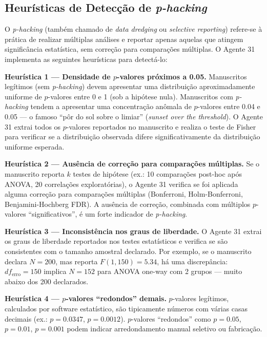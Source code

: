 
\subsection{Heurísticas de Detecção de \textit{p-hacking}}
\label{sec:phacking}

O \textit{p-hacking} (também chamado de \textit{data dredging} ou
\textit{selective reporting}) refere-se à prática de realizar
múltiplas análises e reportar apenas aquelas que atingem
significância estatística, sem correção para comparações
múltiplas. O Agente 31 implementa as seguintes heurísticas para
detectá-lo:

\textbf{Heurística 1 — Densidade de $p$-valores próximos a 0.05.}
Manuscritos legítimos (sem \textit{p-hacking}) devem apresentar uma
distribuição aproximadamente uniforme de $p$-valores entre 0 e 1
(sob a hipótese nula). Manuscritos com \textit{p-hacking} tendem a
apresentar uma concentração anômala de $p$-valores entre 0.04 e
0.05 — o famoso ``pôr do sol sobre o limiar'' (\textit{sunset over
the threshold}). O Agente 31 extrai todos os $p$-valores reportados
no manuscrito e realiza o teste de Fisher para verificar se a
distribuição observada difere significativamente da distribuição
uniforme esperada.

\textbf{Heurística 2 — Ausência de correção para comparações
múltiplas.} Se o manuscrito reporta $k$ testes de hipótese (ex.: 10
comparações post-hoc após ANOVA, 20 correlações exploratórias), o
Agente 31 verifica se foi aplicada alguma correção para
comparações múltiplas (Bonferroni, Holm-Bonferroni,
Benjamini-Hochberg FDR). A ausência de correção, combinada com
múltiplos $p$-valores ``significativos'', é um forte indicador de
\textit{p-hacking}.

\textbf{Heurística 3 — Inconsistência nos graus de liberdade.} O
Agente 31 extrai os graus de liberdade reportados nos testes
estatísticos e verifica se são consistentes com o tamanho amostral
declarado. Por exemplo, se o manuscrito declara $N = 200$, mas
reporta $F(1, 150) = 5.34$, há uma discrepância: $df_{\text{erro}}
= 150$ implica $N = 152$ para ANOVA one-way com 2 grupos — muito
abaixo dos 200 declarados.

\textbf{Heurística 4 — $p$-valores ``redondos'' demais.}
$p$-valores legítimos, calculados por software estatístico, são
tipicamente números com várias casas decimais (ex.: $p = 0.0347$,
$p = 0.0012$). $p$-valores ``redondos'' como $p = 0.05$, $p =
0.01$, $p = 0.001$ podem indicar arredondamento manual seletivo ou
fabricação.

